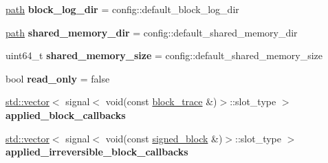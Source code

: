 \begin{DoxyCompactItemize}
\item 
\mbox{\label{structaacio_1_1chain_1_1chain__controller_1_1controller__config_a801a4258dc92c59d0daf7ddeeadfdf47}} 
\mbox{\hyperlink{classfc_1_1path}{path}} {\bfseries block\+\_\+log\+\_\+dir} = config\+::default\+\_\+block\+\_\+log\+\_\+dir
\item 
\mbox{\label{structaacio_1_1chain_1_1chain__controller_1_1controller__config_a341198c5f1baa6daa85f764c5aad5edc}} 
\mbox{\hyperlink{classfc_1_1path}{path}} {\bfseries shared\+\_\+memory\+\_\+dir} = config\+::default\+\_\+shared\+\_\+memory\+\_\+dir
\item 
\mbox{\label{structaacio_1_1chain_1_1chain__controller_1_1controller__config_a9322a902d78214c675ddd3ef3e615910}} 
uint64\+\_\+t {\bfseries shared\+\_\+memory\+\_\+size} = config\+::default\+\_\+shared\+\_\+memory\+\_\+size
\item 
\mbox{\label{structaacio_1_1chain_1_1chain__controller_1_1controller__config_a192051f6d30b3fc25d897049c47d8564}} 
bool {\bfseries read\+\_\+only} = false
\item 
\mbox{\label{structaacio_1_1chain_1_1chain__controller_1_1controller__config_a44949a2d52958fcb93e860e9afd74eaa}} 
\mbox{\hyperlink{classstd_1_1vector}{std\+::vector}}$<$ signal$<$ void(const \mbox{\hyperlink{structaacio_1_1chain_1_1block__trace}{block\+\_\+trace}} \&)$>$\+::slot\+\_\+type $>$ {\bfseries applied\+\_\+block\+\_\+callbacks}
\item 
\mbox{\label{structaacio_1_1chain_1_1chain__controller_1_1controller__config_a53d9ebe1db5a11383c3ca7b61cb33187}} 
\mbox{\hyperlink{classstd_1_1vector}{std\+::vector}}$<$ signal$<$ void(const \mbox{\hyperlink{structaacio_1_1chain_1_1signed__block}{signed\+\_\+block}} \&)$>$\+::slot\+\_\+type $>$ {\bfseries applied\+\_\+irreversible\+\_\+block\+\_\+callbacks}
\item 

\end{DoxyCompactItemize}
